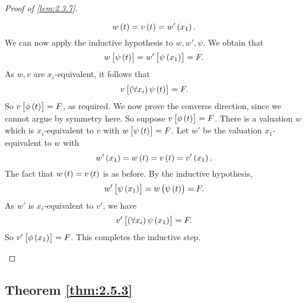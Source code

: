 \begin{proof}[Proof of \ref{lem:2.3.7}]
\begin{itemize}
$$ w\br{t} = v\br{t} = w'\br{x_1}. $$
We can now apply the inductive hypothesis to $ w, w', \psi $. We obtain that
$$ w\sbr{\psi\br{t}} = w'\sbr{\psi\br{x_1}} = F. $$
As $ w, v $ are $ x_i $-equivalent, it follows that
$$ v\sbr{\fab{x_i}\psi\br{t}} = F. $$
So $ v\sbr{\phi\br{t}} = F $, as required. We now prove the converse direction, since we cannot argue by symmetry here. So suppose $ v\sbr{\phi\br{t}} = F $. There is a valuation $ w $ which is $ x_i $-equivalent to $ v $ with $ w\sbr{\psi\br{t}} = F $. Let $ w' $ be the valuation $ x_1 $-equivalent to $ w $ with
$$ w'\br{x_1} = w\br{t} = v\br{t} = v'\br{x_1}. $$
The fact that $ w\br{t} = v\br{t} $ is as before. By the inductive hypothesis,
$$ w'\sbr{\psi\br{x_1}} = w\br{\psi\br{t}} = F. $$
As $ w' $ is $ x_i $-equivalent to $ v' $, we have
$$ v'\sbr{\fab{x_i}\psi\br{x_1}} = F. $$
So $ v'\sbr{\phi\br{x_1}} = F $. This completes the inductive step.
\end{itemize}
\end{proof}

\pagebreak

\subsection{Theorem \ref{thm:2.5.3}}

